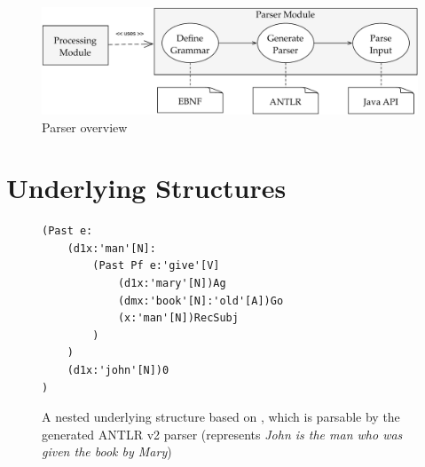 \documentclass[a4paper, halfparskip, onecolumn, abstractoff, final]{scrartcl}
\begin{document}
\begin{figure}
\begin{center}
\mbox{\includegraphics[width=15cm]{parser.pdf}}
\end{center}
\caption{Parser overview} \label{parser-overview}
\end{figure}






\section{Underlying Structures}

\begin{figure}
\begin{center}
\begin{verbatim}
(Past e:
    (d1x:'man'[N]:
        (Past Pf e:'give'[V]
            (d1x:'mary'[N])Ag  
            (dmx:'book'[N]:'old'[A])Go
            (x:'man'[N])RecSubj
        )
    )
    (d1x:'john'[N])0
)
\end{verbatim}
\caption{A nested underlying structure based on \cite{Dik1997a}, which is parsable by the generated ANTLR v2 parser (represents \emph{John is the man who was given the book by Mary})}\label{antlr-input}
\end{center}
\end{figure}
\end{document}
